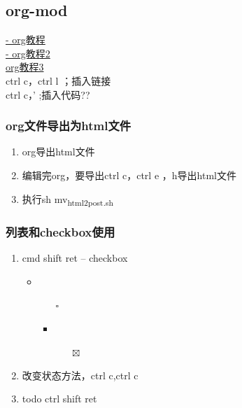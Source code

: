 \documentclass[11pt]{article}
\begin{document}
\subsection{org-mod}
\label{sec:orgb6696d2}
\href{https://www.cnblogs.com/GarfieldEr007/p/5588979.html}{- org教程}\\
\href{https://www.jianshu.com/p/78ef59327e2d}{- org教程2}\\

\href{https://www.cnblogs.com/qlwy/archive/2012/06/15/2551034.html\#sec-4-2}{org教程3}\\
ctrl c，ctrl l ；插入链接\\
ctrl c，' ;插入代码??\\


\subsubsection{org文件导出为html文件}
\label{sec:orgbee1e9e}
\begin{enumerate}
\item org导出html文件\\
\item 编辑完org，要导出ctrl c，ctrl e ，h导出html文件\\
\item 执行sh mv\textsubscript{html2post.sh}\\
\end{enumerate}

\subsubsection{列表和checkbox使用}
\label{sec:org25fb057}
\begin{enumerate}
\item cmd shift ret -- checkbox\\
\begin{itemize}
\item\relax [0/1]\\
\begin{itemize}
\item[{$\square$}] 

\item\relax [100\%]\\
\begin{itemize}
\item[{$\boxtimes$}] 
\end{itemize}
\end{itemize}
\end{itemize}
\item 改变状态方法，ctrl c,ctrl c\\
\item todo ctrl shift ret\\
\end{enumerate}
\end{document}
